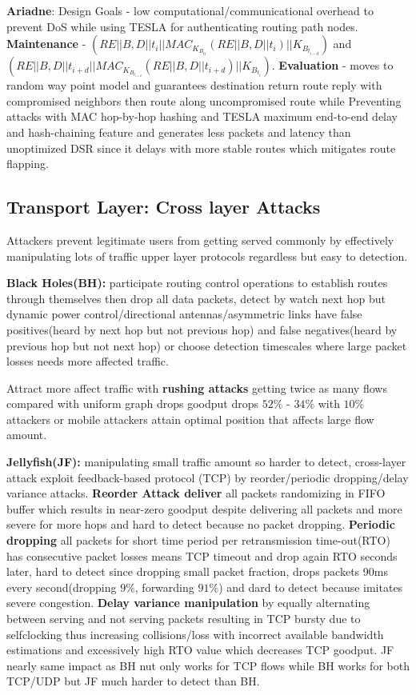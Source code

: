 \documentclass[9pt]{extarticle}
\begin{document}
\begin{multicols}{2}
\textbf{Ariadne}: Design Goals - low computational/communicational overhead to prevent DoS while using TESLA for authenticating routing path nodes. \textbf{Maintenance} - $(RE||B,D||t_i||MAC_{K_{B_{ti}}}(RE||B,D||t_i)||K_{B_{t_{i-d}}})$ and $(RE||B,D||t_{i+d}||MAC_{K_{B_{t_{i+d}}}}(RE||B,D||t_{i+d})||K_{B_{t_i}})$. \textbf{Evaluation} - moves to random way point model and guarantees destination return route reply with compromised neighbors then route along uncompromised route while Preventing attacks with MAC hop-by-hop hashing and TESLA maximum end-to-end delay and hash-chaining feature and generates less packets and latency than unoptimized DSR since it delays with more stable routes which mitigates route flapping. 

\subsection{Transport Layer: Cross layer Attacks}

Attackers prevent legitimate users from getting served commonly by effectively manipulating lots of traffic upper layer protocols regardless but easy to detection.

\textbf{Black Holes(BH):} participate routing control operations to establish routes through themselves then drop all data packets, detect by watch next hop but dynamic power control/directional antennas/asymmetric links have false positives(heard by next hop but not previous hop) and false negatives(heard by previous hop but not next hop) or choose detection timescales where large packet losses needs more affected traffic.

Attract more affect traffic with \textbf{rushing attacks} getting twice as many flows compared with uniform graph drops goodput drops $52\%$ - $34\%$ with $10\%$ attackers or mobile attackers attain optimal position that affects large flow amount.

\textbf{Jellyfish(JF):} manipulating small traffic amount so harder to detect, cross-layer attack exploit feedback-based protocol (TCP) by reorder/periodic dropping/delay variance attacks. \textbf{Reorder Attack deliver} all packets randomizing in FIFO buffer which results in near-zero goodput despite delivering all packets and more severe for more hops and hard to detect because no packet dropping. \textbf{Periodic dropping} all packets for short time period per retransmission time-out(RTO) has consecutive packet losses means TCP timeout and drop again RTO seconds later, hard to detect since dropping small packet fraction, drops packets 90ms every second(dropping $9\%$, forwarding $91\%$) and dard to detect because imitates severe congestion. \textbf{Delay variance manipulation} by equally alternating between serving and not serving packets resulting in TCP bursty due to selfclocking thus increasing collisions/loss with incorrect available bandwidth estimations and excessively high RTO value which decreases TCP goodput. JF nearly same impact as BH nut only works for TCP flows while BH works for both TCP/UDP but JF much harder to detect than BH.


\end{multicols}
\end{document}
